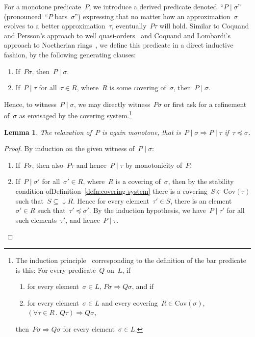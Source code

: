 \documentclass[com,11pt,crcready]{iosart2x}
\theoremstyle{definition}
\theoremstyle{plain}
\newtheorem{lemma}[definition]{Lemma}
\theoremstyle{remark}
\newcommand{\?}{\,{:}\,}
\newcommand{\Cov}{\mathrm{Cov}}
\renewcommand{\_}{\mathpunct{.}\,}
\begin{document}
For a monotone predicate~$P$, we introduce a derived predicate denoted~``$P
\mid \sigma$'' (pronounced~``$P$ bars~$\sigma$'') expressing that no matter how an approximation~$\sigma$ evolves
to a better approximation~$\tau$, eventually~$P\tau$ will hold. Similar to
Coquand and Persson's approach to well quasi-orders~\cite[Definition~6]{coquand-persson:groebner} and
Coquand and Lombardi's approach to Noetherian
rings~\cite{coquand-lombardi:krull,coquand:invariant}, we define this predicate
in a direct inductive fashion, by the following generating clauses:
\begin{enumerate}
\item If~$P\sigma$, then~$P \mid \sigma$.
\item If~$P \mid \tau$ for all~$\tau \in R$, where~$R$ is some covering
of~$\sigma$, then~$P \mid \sigma$.
\end{enumerate}
Hence, to witness~$P \mid \sigma$, we may directly witness~$P\sigma$ or first
ask for a refinement of~$\sigma$ as envisaged by the covering
system.\footnote{The induction
principle~\cite{aczel-rathjen:notes,aczel-rathjen:cstdraft,rathjen:genind,aczel:ind} corresponding to the definition of the
bar predicate is this: For every predicate~$Q$ on~$L$, if
\begin{enumerate}
\item for every element~$\sigma \in L$, $P\sigma \Rightarrow Q\sigma$, and if
\item for every element~$\sigma \in L$ and every covering~$R \in \Cov(\sigma)$,
$(\forall \tau \in R\_ Q\tau) \Rightarrow Q\sigma$,
\end{enumerate}
then~$P\sigma \Rightarrow Q\sigma$ for every element~$\sigma \in L$.}

\begin{lemma}The relaxation of~$P$ is again monotone, that is~$P \mid \sigma
\Rightarrow P \mid \tau$ if~$\tau \preccurlyeq \sigma$.\end{lemma}

\begin{proof}By induction on the given witness of~$P \mid \sigma$:
\begin{enumerate}
\item If~$P\sigma$, then also~$P\tau$ and hence~$P \mid \tau$ by
monotonicity of~$P$.
\item If~$P \mid \sigma'$ for all~$\sigma' \in R$, where~$R$ is a covering
of~$\sigma$, then by the stability condition
ofDefinition~\ref{defn:covering-system} there is a covering~$S \in \Cov(\tau)$
such that~$S \subseteq {\downarrow}R$. Hence for every element~$\tau' \in S$,
there is an element~$\sigma' \in R$ such that~$\tau' \preccurlyeq \sigma'$. By the
induction hypothesis, we have~$P \mid \tau'$ for all such elements~$\tau'$, and
hence~$P \mid \tau$. \qedhere
\end{enumerate}
\end{proof}
\end{document}
